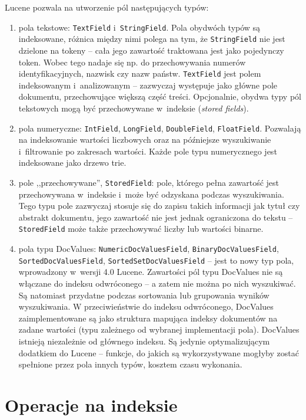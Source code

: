 Lucene pozwala na utworzenie pól następujących typów:
\begin{enumerate}
 \item pola tekstowe: \texttt{TextField} i~\texttt{StringField}. Pola obydwóch typów są indeksowane, różnica między nimi polega na tym, że \texttt{StringField} nie jest dzielone na tokeny -- cała jego zawartość traktowana jest jako pojedynczy token. Wobec tego nadaje się np. do przechowywania numerów identyfikacyjnych, nazwisk czy nazw państw. \texttt{TextField} jest polem indeksowanym i~analizowanym -- zazwyczaj występuje jako główne pole dokumentu, przechowujące większą część treści. Opcjonalnie, obydwa typy pól tekstowych mogą być przechowywane w~indeksie (\emph{stored fields}).
 \item pola numeryczne: \texttt{IntField}, \texttt{LongField}, \texttt{DoubleField}, \texttt{FloatField}. Pozwalają na indeksowanie wartości liczbowych oraz na późniejsze wyszukiwanie i~filtrowanie po zakresach wartości. Każde pole typu numerycznego jest indeksowane jako drzewo trie.
 \item pole ,,przechowywane'', \texttt{StoredField}: pole, którego pełna zawartość jest przechowywana w~indeksie i~może być odzyskana podczas wyszukiwania. Tego typu pole zazwyczaj stosuje się do zapisu takich informacji jak tytuł czy abstrakt dokumentu, jego zawartość nie jest jednak ograniczona do tekstu -- \texttt{StoredField} może także przechowywać liczby lub wartości binarne.
 \item pola typu DocValues: \texttt{NumericDocValuesField}, \texttt{BinaryDocValuesField}, \texttt{SortedDocValuesField}, \texttt{SortedSetDocValuesField} -- jest to nowy typ pola, wprowadzony w~wersji 4.0 Lucene. Zawartości pól typu DocValues nie są włączane do indeksu odwróconego -- a zatem nie można po nich wyszukiwać. Są natomiast przydatne podczas sortowania lub grupowania wyników wyszukiwania. W przeciwieństwie do indeksu odwróconego, DocValues zaimplementowane są jako struktura mapująca indeksy dokumentów na zadane wartości (typu zależnego od wybranej implementacji pola). DocValues istnieją niezależnie od głównego indeksu. Są jedynie optymalizującym dodatkiem do Lucene -- funkcje, do jakich są wykorzystywane mogłyby zostać spełnione przez pola innych typów, kosztem czasu wykonania. 
\end{enumerate}

\section{Operacje na indeksie}

